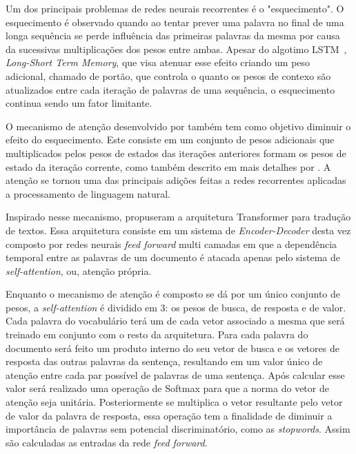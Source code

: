 Um dos principais problemas de redes neurais recorrentes é o "esquecimento".
O esquecimento é observado quando ao tentar prever uma palavra no final de uma
longa sequência se perde influência das primeiras palavras da mesma por causa da
sucessivas multiplicações dos pesos entre ambas.
Apesar do algotimo LSTM~\cite{hochreiter97}, \textit{Long-Short Term Memory},
que visa atenuar esse efeito criando um peso adicional, chamado de portão, que
controla o quanto os pesos de contexo são atualizados entre cada iteração de
palavras de uma sequência, o esquecimento continua sendo um fator limitante.

O mecanismo de atenção desenvolvido por \citet{bahdanau14} também tem como
objetivo diminuir o efeito do esquecimento.
Este consiste em um conjunto de pesos adicionais que multiplicados pelos pesos
de estados das iterações anteriores formam os pesos de estado da iteração
corrente, como também descrito em mais detalhes por \citet{luong15}.
A atenção se tornou uma das principais adições feitas a redes recorrentes
aplicadas a processamento de linguagem natural.

Inspirado nesse mecanismo, \citet{vaswani17} propuseram a arquitetura
Transformer para tradução de textos.
Essa arquitetura consiste em um sistema de \textit{Encoder-Decoder} desta vez
composto por redes neurais \textit{feed forward} multi camadas em que a
dependência temporal entre as palavras de um documento é atacada apenas pelo
sistema de \textit{self-attention}, ou, atenção própria.

Enquanto o mecanismo de atenção é composto se dá por um único conjunto de pesos,
a \textit{self-attention} é dividido em 3: os pesos de busca, de resposta e de
valor.
Cada palavra do vocabulário terá um de cada vetor associado a mesma que será
treinado em conjunto com o resto da arquitetura.
Para cada palavra do documento será feito um produto interno do seu vetor de
busca e os vetores de resposta das outras palavras da sentença, resultando em um
valor único de atenção entre cada par possível de palavras de uma sentença.
Após calcular esse valor será realizado uma operação de Softmax para que a norma
do vetor de atenção seja unitária.
Posteriormente se multiplica o vetor resultante pelo vetor de valor da palavra
de resposta, essa operação tem a finalidade de diminuir a importância de
palavras sem potencial discriminatório, como as \textit{stopwords}.
Assim são calculadas as entradas da rede \textit{feed forward}.



